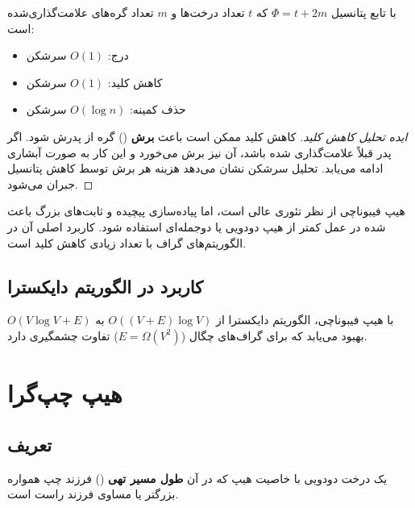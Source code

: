\documentclass{matinbook}
\begin{document}
    \begin{theorem}
        با تابع پتانسیل
        $\Phi = t + 2m$
        که $t$ تعداد درخت‌ها و $m$ تعداد
        گره‌های علامت‌گذاری‌شده است:
        \begin{itemize}
            \item درج: $O(1)$ سرشکن
            \item کاهش کلید: $O(1)$ سرشکن
            \item حذف کمینه: $O(\log n)$ سرشکن
        \end{itemize}
        \label{thm:fibonacci-amortized}
    \end{theorem}
    
    \begin{proof}[ایده تحلیل کاهش کلید]
        کاهش کلید ممکن است باعث \textbf{برش}
        () گره از پدرش شود.
        اگر پدر قبلاً علامت‌گذاری شده باشد،
        آن نیز برش می‌خورد و این کار
        به صورت آبشاری ادامه می‌یابد.
        تحلیل سرشکن نشان می‌دهد هزینه هر برش
        توسط کاهش پتانسیل جبران می‌شود.
    \end{proof}
    
    \begin{remark}
        هیپ فیبوناچی از نظر تئوری عالی است،
        اما پیاده‌سازی پیچیده و ثابت‌های بزرگ
        باعث شده در عمل کمتر از هیپ دودویی
        یا دوجمله‌ای استفاده شود.
        کاربرد اصلی آن در الگوریتم‌های گراف
        با تعداد زیادی کاهش کلید است.
        \label{rem:fibonacci-practical}
    \end{remark}
    
    \subsection{کاربرد در الگوریتم دایکسترا}
    
    با هیپ فیبوناچی، الگوریتم دایکسترا
    از $O((V+E)\log V)$ به
    $O(V \log V + E)$ بهبود می‌یابد
    که برای گراف‌های چگال
    ($E = \Omega(V^{2})$) تفاوت چشمگیری دارد.
    
    \section{هیپ چپ‌گرا}
    
    \subsection{تعریف}
    
    \begin{definition}
        یک درخت دودویی با خاصیت هیپ که در آن
        \textbf{طول مسیر تهی}
        () فرزند چپ
        همواره بزرگتر یا مساوی فرزند راست است.
        \label{def:leftist-heap}
    \end{definition}
    
\end{document}
